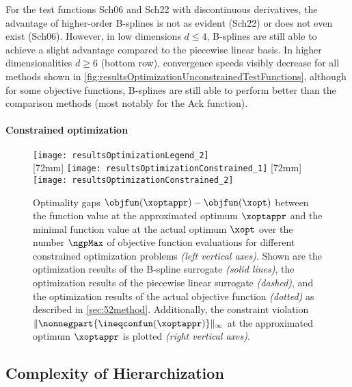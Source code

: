 For the test functions Sch06 and Sch22 with discontinuous derivatives,
the advantage of higher-order B-splines is not as evident (Sch22) or
does not even exist (Sch06).
However, in low dimensions $d \le 4$, B-splines are still able
to achieve a slight advantage compared to the piecewise linear basis.
In higher dimensionalities $d \ge 6$ (bottom row),
convergence speeds visibly decrease for all methods shown in
\cref{fig:resultsOptimizationUnconstrainedTestFunctions},
although for some objective functions, B-splines are still able
to perform better than the comparison methods
(most notably for the Ack function).

\paragraph{Constrained optimization}

\blindtext{}

\begin{figure}
  \texttt{[image: resultsOptimizationLegend\_2]}\\[2mm]%
  [72mm]{%
    \texttt{[image: resultsOptimizationConstrained\_1]}%
  }%
  \hfill%
  [72mm]{%
    \texttt{[image: resultsOptimizationConstrained\_2]}%
  }%
  \caption[Optimality gaps for different objective functions (constrained)]{%
    Optimality gaps $\objfun(\xoptappr) - \objfun(\xopt)$ between
    the function value at the approximated optimum $\xoptappr$ and
    the minimal function value at the actual optimum $\xopt$
    over the number $\ngpMax$ of objective function evaluations
    for different constrained optimization problems
    \emph{(left vertical axes)}.
    Shown are the optimization results of the B-spline surrogate
    \emph{(solid lines)},
    the optimization results of the piecewise linear surrogate
    \emph{(dashed)}, and
    the optimization results of the actual objective function
    \emph{(dotted)} as described in \cref{sec:52method}.
    Additionally, the constraint violation
    $\norm[\infty]{\nonnegpart{\ineqconfun(\xoptappr)}}$
    at the approximated optimum $\xoptappr$ is plotted
    \emph{(right vertical axes)}.%
  }%
  \label{fig:resultsOptimizationConstrainedTestFunctions}%
\end{figure}



\subsection{Complexity of Hierarchization}
\label{sec:543complexity}

